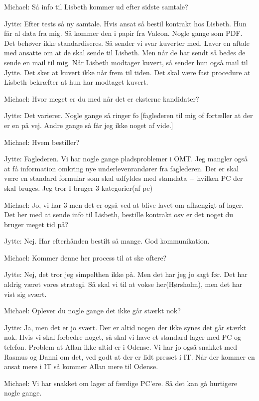\begin{linenumbers*}
Michael:
Så info til Lisbeth kommer ud efter sidste samtale?

Jytte:
Efter tests så ny samtale. Hvis ansat så bestil kontrakt hos Lisbeth.
Hun får al data fra mig.
Så kommer den i papir fra Valcon. Nogle gange som PDF.
Det behøver ikke standardiseres. 
Så sender vi svar kuverter med. Laver en aftale med ansatte
om at de skal sende til Lisbeth.
Men når de har sendt så bedes de sende en mail til mig. 
Når Lisbeth modtager kuvert, så sender hun også mail til Jytte.
Det sker at kuvert ikke når frem til tiden.
Det skal være fast procedure at Lisbeth bekræfter at hun har modtaget kuvert.

Michael:
Hvor meget er du med når det er eksterne kandidater?

Jytte:
Det varierer. Nogle gange så ringer fo
[faglederen til mig of fortæller at der er en på vej. 
Andre gange så får jeg ikke noget af vide.]

Michael:
Hvem bestiller?

Jytte:
Faglederen. Vi har nogle gange pladsproblemer i OMT.
Jeg mangler også at få information omkring nye underlevenrandører fra faglederen. 
Der er skal være en standard formular som skal udfyldes med stamdata
+ hvilken PC der skal bruges. 
Jeg tror I bruger 3 kategorier(af pc)

Michael:
Jo, vi har 3 men det er også ved at blive lavet om afhængigt af lager.
Det her med at sende info til Lisbeth,
bestille kontrakt osv er det noget du bruger meget tid på?

Jytte:
Nej. Har efterhånden bestilt så mange. God kommunikation.

Michael:
Kommer denne her process til at ske oftere?

Jytte:
Nej, det tror jeg simpelthen ikke på. Men det har jeg jo sagt før.
Det har aldrig været vores strategi.
Så skal vi til at vokse her(Hørsholm), men det har vist sig svært.

Michael:
Oplever du nogle gange det ikke går stærkt nok?

Jytte:
Ja, men det er jo svært. Der er altid nogen der ikke synes det går stærkt nok.
Hvis vi skal forbedre noget, så skal vi have et standard lager med PC og telefon.
Problem at Allan ikke altid er i Odense.
Vi har jo også snakket med Rasmus og Danni om det, ved godt at der er lidt presset i IT.
Når der kommer en ansat mere i IT så kommer Allan mere til Odense.

Michael:
Vi har snakket om lager af færdige PC’ere. Så det kan gå hurtigere nogle gange.


\end{linenumbers*}
